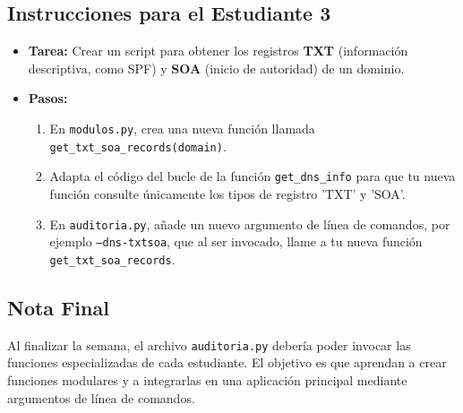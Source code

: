 \documentclass[12pt]{article}
\begin{document}
\subsection*{Instrucciones para el Estudiante 3}
\begin{itemize}
    \item \textbf{Tarea:} Crear un script para obtener los registros \textbf{TXT} (información descriptiva, como SPF) y \textbf{SOA} (inicio de autoridad) de un dominio.
    \item \textbf{Pasos:}
    \begin{enumerate}
        \item En \texttt{modulos.py}, crea una nueva función llamada \texttt{get\_txt\_soa\_records(domain)}.
        \item Adapta el código del bucle de la función \texttt{get\_dns\_info} para que tu nueva función consulte únicamente los tipos de registro 'TXT' y 'SOA'.
        \item En \texttt{auditoria.py}, añade un nuevo argumento de línea de comandos, por ejemplo \texttt{--dns-txtsoa}, que al ser invocado, llame a tu nueva función \texttt{get\_txt\_soa\_records}.
    \end{enumerate}
\end{itemize}

\subsection*{Nota Final}
Al finalizar la semana, el archivo \texttt{auditoria.py} debería poder invocar las funciones especializadas de cada estudiante. El objetivo es que aprendan a crear funciones modulares y a integrarlas en una aplicación principal mediante argumentos de línea de comandos.
\end{document}

